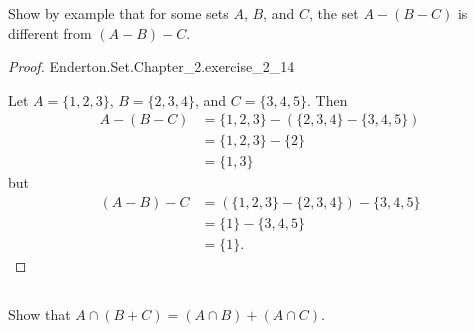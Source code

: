 \documentclass{report}
\begin{document}
Show by example that for some sets $A$, $B$, and $C$, the set $A - (B - C)$ is
  different from $(A - B) - C$.

\begin{proof}

    {Enderton.Set.Chapter\_2.exercise\_2\_14}

  Let $A = \{1, 2, 3\}$, $B = \{2, 3, 4\}$, and $C = \{3, 4, 5\}$.
  Then
    \begin{align*}
      A - (B - C)
        & = \{1, 2, 3\} - (\{2, 3, 4\} - \{3, 4, 5\}) \\
        & = \{1, 2, 3\} - \{2\} \\
        & = \{1, 3\}
    \end{align*}
    but
    \begin{align*}
      (A - B) - C
        & = (\{1, 2, 3\} - \{2, 3, 4\}) - \{3, 4, 5\} \\
        & = \{1\} - \{3, 4, 5\} \\
        & = \{1\}.
    \end{align*}

\end{proof}

\subsection{}%

Show that $A \cap (B + C) = (A \cap B) + (A \cap C)$.
\end{document}
